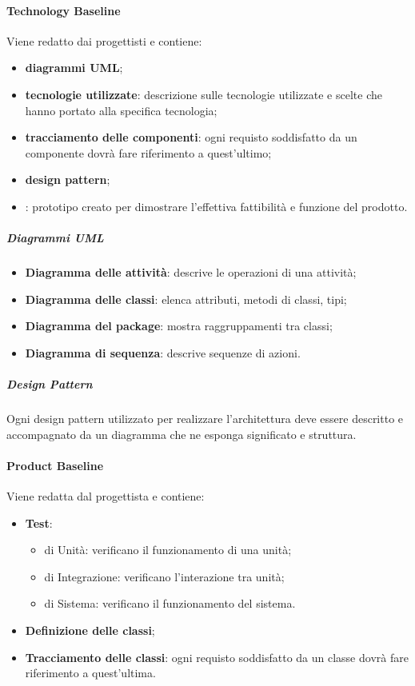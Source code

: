 \paragraph{Technology Baseline} \hfill \break
Viene redatto dai progettisti e contiene:
\begin{itemize}
  \item \textbf{diagrammi UML};
  \item \textbf{tecnologie utilizzate}: descrizione sulle tecnologie utilizzate e scelte che hanno portato alla specifica tecnologia;
  \item \textbf{tracciamento delle componenti}: ogni requisto soddisfatto da un componente dovrà fare riferimento a quest'ultimo;
  \item \textbf{design pattern};
  \item \textbf{}: prototipo creato per dimostrare l'effettiva fattibilità e funzione del prodotto.
\end{itemize}
  \subparagraph{Diagrammi UML} 
  \begin{itemize}
    \item \textbf{Diagramma delle attività}: descrive le operazioni di una attività;
    \item \textbf{Diagramma delle classi}: elenca attributi, metodi di classi, tipi; 
    \item \textbf{Diagramma del package}: mostra raggruppamenti tra classi;
    \item \textbf{Diagramma di sequenza}: descrive sequenze di azioni.
  \end{itemize}
     
  \subparagraph{Design Pattern} \hfill \break
  Ogni design pattern utilizzato per realizzare l'architettura deve essere descritto e accompagnato da un diagramma che ne esponga significato e struttura.

\paragraph{Product Baseline} \hfill \break
Viene redatta dal progettista e contiene:
\begin{itemize}
  \item \textbf{Test}:
  \begin{itemize}
    \item di Unità: verificano il funzionamento di una unità;
    \item di Integrazione: verificano l'interazione tra unità;
    \item di Sistema: verificano il funzionamento del sistema.
  \end{itemize}
  \item \textbf{Definizione delle classi};
  \item \textbf{Tracciamento delle classi}: ogni requisto soddisfatto da un classe dovrà fare riferimento a quest'ultima.
  
\end{itemize}

